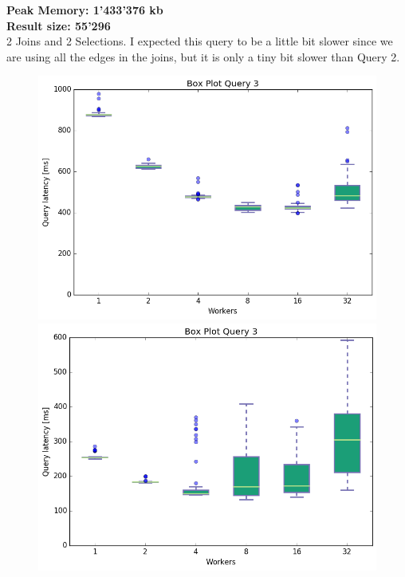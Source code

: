 \documentclass[11pt,singlecolumn]{scrartcl}
\begin{document}
\textbf{Peak Memory: 1'433'376 kb}\\
\textbf{Result size: 55'296}\\
2 Joins and 2 Selections. I expected this query to be a little bit slower since we are using all the edges in the joins, but it is only a tiny bit slower than Query 2.
\clearpage
\begin{figure}[!tbp]
  \centering
  \RawFloats
  \begin{minipage}[b]{0.5\textwidth}
    \includegraphics[width=\textwidth]{boxesfl/q3}
  \end{minipage}
  \hfill
  \begin{minipage}[b]{0.5\textwidth}
    \includegraphics[width=\textwidth]{boxesfs/q3}
  \end{minipage}
\end{figure}
\end{document}
